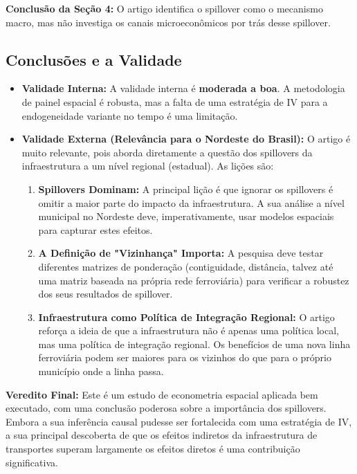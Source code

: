\documentclass[12pt, a4paper]{article}
\begin{document}
\noindent\textbf{Conclusão da Seção 4:} O artigo identifica o spillover como o mecanismo macro, mas não investiga os canais microeconômicos por trás desse spillover.

\subsection{Conclusões e a Validade}
\begin{itemize}
    \item \textbf{Validade Interna:} A validade interna é \textbf{moderada a boa}. A metodologia de painel espacial é robusta, mas a falta de uma estratégia de IV para a endogeneidade variante no tempo é uma limitação.
    \item \textbf{Validade Externa (Relevância para o Nordeste do Brasil):} O artigo é muito relevante, pois aborda diretamente a questão dos spillovers da infraestrutura a um nível regional (estadual). As lições são:
        \begin{enumerate}
            \item \textbf{Spillovers Dominam:} A principal lição é que ignorar os spillovers é omitir a maior parte do impacto da infraestrutura. A sua análise a nível municipal no Nordeste deve, imperativamente, usar modelos espaciais para capturar estes efeitos.
            \item \textbf{A Definição de "Vizinhança" Importa:} A pesquisa deve testar diferentes matrizes de ponderação (contiguidade, distância, talvez até uma matriz baseada na própria rede ferroviária) para verificar a robustez dos seus resultados de spillover.
            \item \textbf{Infraestrutura como Política de Integração Regional:} O artigo reforça a ideia de que a infraestrutura não é apenas uma política local, mas uma política de integração regional. Os benefícios de uma nova linha ferroviária podem ser maiores para os vizinhos do que para o próprio município onde a linha passa.
        \end{enumerate}
\end{itemize}

\noindent\textbf{Veredito Final:} Este é um estudo de econometria espacial aplicada bem executado, com uma conclusão poderosa sobre a importância dos spillovers. Embora a sua inferência causal pudesse ser fortalecida com uma estratégia de IV, a sua principal descoberta de que os efeitos indiretos da infraestrutura de transportes superam largamente os efeitos diretos é uma contribuição significativa. 
\end{document}
